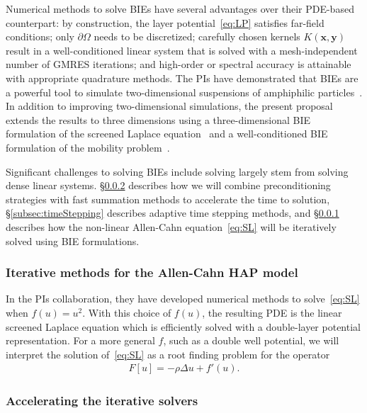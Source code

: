 Numerical methods to solve BIEs have several advantages over their
PDE-based counterpart: by construction, the layer
potential~\eqref{eq:LP} satisfies far-field conditions; only
$\partial\Omega$ needs to be discretized; carefully chosen kernels
$K(\mathbf{x},\mathbf{y})$ result in a well-conditioned linear system
that is solved with a mesh-independent number of GMRES iterations; and
high-order or spectral accuracy is attainable with appropriate
quadrature methods. The PIs have demonstrated that BIEs are a powerful
tool to simulate two-dimensional suspensions of amphiphilic
particles~\cite{Fu2018_SIAM, FuQuRyYo20}. In addition to improving
two-dimensional simulations, the present proposal extends the results to
three dimensions using a three-dimensional BIE formulation of the
screened Laplace equation~\cite{ying_2006} and a well-conditioned BIE
formulation of the mobility problem~\cite{manasthesis, rac-gre2016}.

Significant challenges to solving BIEs include solving largely stem from
solving dense linear systems. \S\ref{subsec:NumericalIssues}
describes how we will combine preconditioning strategies with fast
summation methods to accelerate the time to solution,
\S\ref{subsec:timeStepping} describes adaptive time stepping methods,
and \S\ref{subsec:AC} describes how the non-linear Allen-Cahn
equation~\eqref{eq:SL} will be iteratively solved using BIE
formulations.

\subsubsection{Iterative methods for the Allen-Cahn HAP model}
\label{subsec:AC}
In the PIs collaboration, they have developed numerical methods to
solve~\eqref{eq:SL} when $f(u) = u^2$. With this choice of $f(u)$, the
resulting PDE is the linear screened Laplace equation which is
efficiently solved with a double-layer potential representation. For a
more general $f$, such as a double well potential, we will interpret the
solution of~\eqref{eq:SL} as a root finding problem for the operator
\begin{align*}
  F[u] = -\rho \Delta u + f'(u).
\end{align*}



\subsubsection{Accelerating the iterative solvers}
\label{subsec:NumericalIssues}

